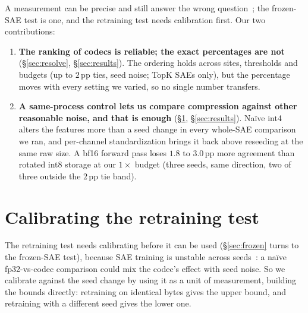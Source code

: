 \documentclass{article}
\begin{document}
A measurement can be precise and still answer the wrong
question~\citep{proxypresumption,validitythreats}; the frozen-SAE test
is one, and the retraining test needs calibration first. Our two
contributions:
\begin{enumerate}
  \item \textbf{The ranking of codecs is reliable; the exact
  percentages are not} (\S\ref{sec:resolve}, \S\ref{sec:results}). The ordering holds
  across sites, thresholds and budgets (up to $2$\,pp ties, seed
  noise; TopK SAEs only), but the percentage moves with every setting
  we varied, so no single number transfers.
  \item \textbf{A same-process control lets us compare compression
  against other reasonable noise, and that is enough}
  (\S\ref{sec:protocol}, \S\ref{sec:results}). Na\"ive
  int4 alters the features more than a seed change in every whole-SAE
  comparison we ran, and per-channel standardization brings it back above
  reseeding at the same raw size. A bf16 forward pass loses $1.8$ to $3.0$\,pp more agreement than
  rotated int8 storage at our $1\times$ budget (three seeds, same
  direction, two of three outside the $2$\,pp tie band).
\end{enumerate}

\section{Calibrating the retraining test}
\label{sec:protocol}

The retraining test needs calibrating before it can be used
(\S\ref{sec:frozen} turns to the frozen-SAE test), because SAE
training is unstable across seeds~\citep{paulo,reprosubspaces}: a
na\"ive fp32-vs-codec comparison could mix the codec's effect with seed
noise. So we
calibrate against the seed change by using it as a unit of
measurement, building the bounds directly: retraining on identical
bytes gives the upper bound, and retraining with a different seed
gives the lower one.
\end{document}
